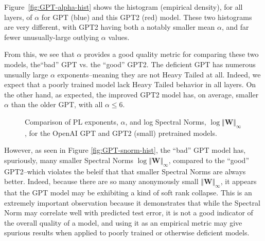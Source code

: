 Figure~\ref{fig:GPT-alpha-hist} shows the histogram (empirical density), for all layers, of $\alpha$ for GPT (blue) and this GPT2 (red) model.  
These two histograms are very different, with GPT2 having both a notably smaller mean $\alpha$, and far fewer unusually-large outlying $\alpha$ values.

From this, we see that $\alpha$ provides a good quality metric for comparing these two models, the``bad'' GPT vs. the ``good'' GPT2.
The deficient GPT has numerous unsually large $\alpha$ exponents--meaning they are not Heavy Tailed at all.
Indeed, we expect that a poorly trained model lack Heavy Tailed behavior in all layers.
On the other hand, as expected, the improved GPT2 model has, on average, smaller $\alpha$ than the older GPT, with all $\alpha\le6$.  

\begin{figure}
    \centering
   \caption{Comparison of PL exponents, $\alpha$, and log Spectral Norms, $\log\Vert\mathbf{W}\Vert_{\infty}$, for the OpenAI GPT and GPT2 (small) pretrained models.}
\label{fig:GPT-hist}
\end{figure}

However, as seen in Figure \ref{fig:GPT-snorm-hist},
the ``bad'' GPT model has, spuriously, many smaller Spectral Norms $\log\Vert\mathbf{W}\Vert_{\infty}$,
compared to the ``good'' GPT2--which violates the beleif that that smaller Spectral Norms are always better.
Indeed, because there are so many anonymously small $\Vert\mathbf{W}\Vert_{\infty}$,
it appears that the GPT model may be exhibiting a kind of soft rank collapse.
This is an extremely important observation because it demonstrates that while the Spectral Norm
may correlate well with predicted test error, it is not a good indicator of the overall quality of a model,
and using it as an empirical metric may give spurious results when applied to poorly trained
or otherwise deficient models. 

